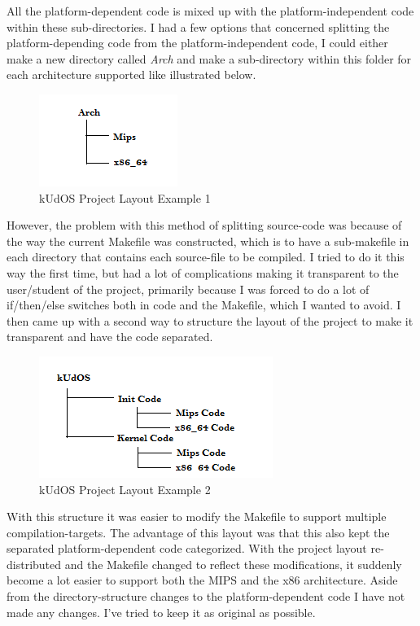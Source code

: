 All the platform-dependent code is mixed up with the platform-independent code within these sub-directories. I had a few options that concerned splitting the platform-depending code from the platform-independent code, I could either make a new directory called \emph{Arch} and make a sub-directory within this folder for each architecture supported like illustrated below.

\begin{figure}[h]
    \centering
    \includegraphics{LayoutProposal1.png}
    \caption{kUdOS Project Layout Example 1}
    \label{fig:code_layout_ex1}
\end{figure}

However, the problem with this method of splitting source-code was because of the way the current Makefile was constructed, which is to have a sub-makefile in each directory that contains each source-file to be compiled. I tried to do it this way the first time, but had a lot of complications making it transparent to the user/student of the project, primarily because I was forced to do a lot of if/then/else switches both in code and the Makefile, which I wanted to avoid. I then came up with a second way to structure the layout of the project to make it transparent and have the code separated.

\begin{figure}[h]
    \centering
    \includegraphics{LayoutProposal2.png}
    \caption{kUdOS Project Layout Example 2}
    \label{fig:code_layout_ex2}
\end{figure}

With this structure it was easier to modify the Makefile to support multiple compilation-targets. The advantage of this layout was that this also kept the separated platform-dependent code categorized. With the project layout re-distributed and the Makefile changed to reflect these modifications, it suddenly become a lot easier to support both the MIPS and the x86 architecture. Aside from the directory-structure changes to the platform-dependent code I have not made any changes. I've tried to keep it as original as possible.

